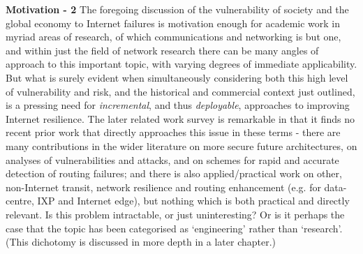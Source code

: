 \textbf{Motivation - 2}
The foregoing discussion of the vulnerability of society and the global economy to Internet failures is motivation enough for academic work in myriad areas of research, of which communications and networking is but one, and within just the field of network research there can be many angles of approach to this important topic, with varying degrees of immediate applicability.
But what is surely evident when simultaneously considering both this high level of vulnerability and risk, and the historical and commercial context just outlined, is a pressing need for \emph{incremental}, and thus \emph{deployable}, approaches to improving Internet resilience.
The later related work survey is remarkable in that it finds no recent prior work that directly approaches this issue in these terms - there are many contributions in the wider literature on more secure future architectures, on analyses of vulnerabilities and attacks, and on schemes for rapid and accurate detection of routing failures; and there is also applied/practical work on other, non-Internet transit, network resilience and routing enhancement (e.g. for data-centre, IXP and Internet edge), but nothing which is both practical and directly relevant.
Is this problem intractable, or just uninteresting? Or is it perhaps the case that the topic has been categorised as `engineering' rather than `research'.
(This dichotomy is discussed in more depth in a later chapter.)
\medskip

